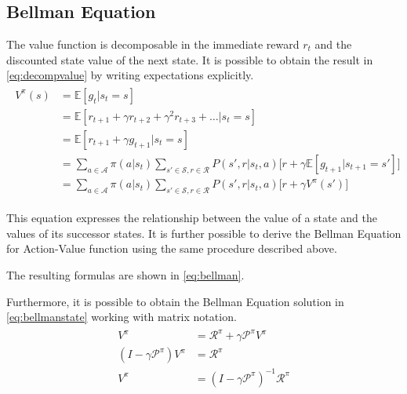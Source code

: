 \appendix

\chapter{}
\section{Bellman Equation} \label{appendix:bellmaneq}


The value function is decomposable in the immediate reward $r_t$ and the discounted state value of the next state. It is possible to obtain the result in \vref{eq:decompvalue} by writing expectations explicitly.
\begin{align}\label{eq:decompvalue}
\begin{split}
V^\pi(s) &= \mathbb{E}[g_t | s_t = s] \\
&= \mathbb{E}[r_{t+1} + \gamma r_{t+2} + \gamma^2 r_{t+3} + \dots | s_t = s] \\
&= \mathbb{E}[r_{t+1} + \gamma g_{t+1} | s_t = s] \\
&= \sum_{a \in \mathcal{A}}\pi(a|s_t)\sum_{s' \in \mathcal{S}, r \in \mathcal{R}}P(s', r | s_t, a)\big[r + \gamma\mathbb{E}[g_{t+1}| s_{t+1} = s']\big]\\
&= \sum_{a \in \mathcal{A}}\pi(a|s_t)\sum_{s' \in \mathcal{S}, r \in \mathcal{R}}P(s', r | s_t, a)\big[r + \gamma V^\pi(s')\big]
\end{split}
\end{align}

This equation expresses the relationship between the value of a state and the values of its successor states. It is further possible to derive the Bellman Equation for Action-Value function using the same procedure described above.

The resulting formulas are shown in \vref{eq:bellman}.

Furthermore, it is possible to obtain the Bellman Equation solution in \vref{eq:bellmanstate} working with matrix notation.
\begin{align} \label{eq:bellmanstate}
\begin{split}
V^\pi &= \mathcal{R}^\pi + \gamma \mathcal{P}^\pi V^\pi \\
(I - \gamma\mathcal{P}^\pi)V^\pi &= \mathcal{R}^\pi \\
V^\pi &= (I - \gamma\mathcal{P}^\pi)^{-1}\mathcal{R}^\pi
\end{split}
\end{align}